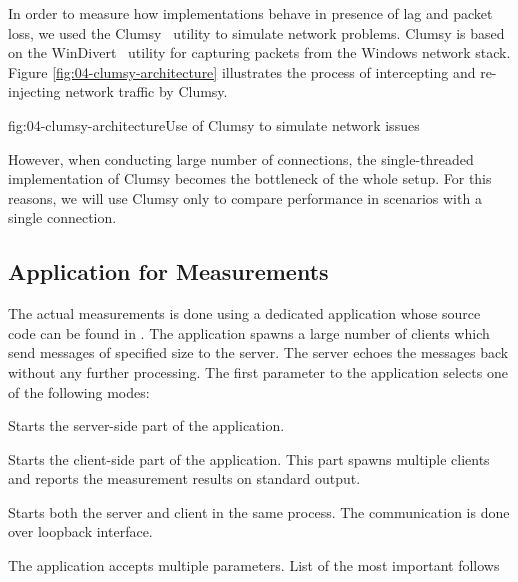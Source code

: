 In order to measure how implementations behave in presence of lag and packet loss, we used the
Clumsy~\cite{clumsy} utility to simulate network problems. Clumsy is based on the
WinDivert~\cite{WinDivert} utility for capturing packets from the Windows network stack. Figure
\autoref{fig:04-clumsy-architecture} illustrates the process of intercepting and re-injecting network
traffic by Clumsy.

\begin{myFigure}{fig:04-clumsy-architecture}{Use of Clumsy to simulate network issues}

  \resizebox{0.7\linewidth}{!}{}

\end{myFigure}

However, when conducting large number of connections, the single-threaded implementation of Clumsy
becomes the bottleneck of the whole setup. For this reasons, we will use Clumsy only to compare
performance in scenarios with a single connection.

\subsection{Application for Measurements}

The actual measurements is done using a dedicated \dotnet{} application whose source code can be
found in . The application spawns a large number of clients which send
messages of specified size to the server. The server echoes the messages back without any further
processing. The first parameter to the application selects one of the following modes:

\begin{description}

   Starts the server-side part of the application.

   Starts the client-side part of the application. This part spawns multiple clients and reports the measurement results on standard output.

   Starts both the server and client in the same process. The communication is done over loopback interface.

\end{description}

The application accepts multiple parameters. List of the most important follows

